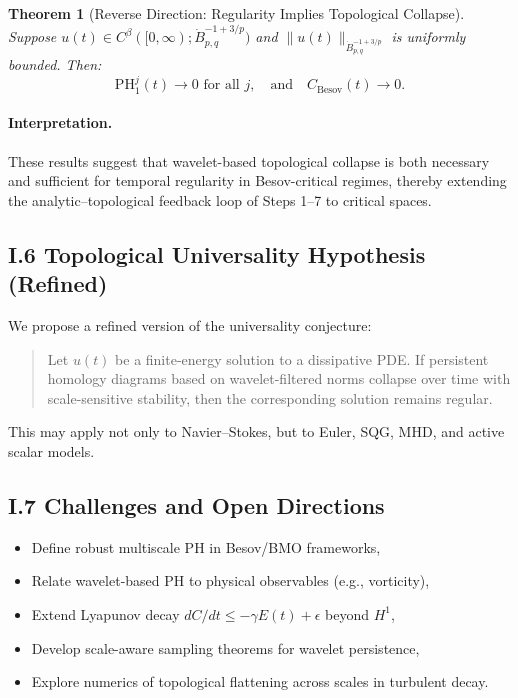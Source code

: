 \documentclass[11pt]{article}
\newtheorem{theorem}{Theorem}[section]
\theoremstyle{definition}
\begin{document}
\begin{theorem}[Reverse Direction: Regularity Implies Topological Collapse]
Suppose $u(t) \in C^\beta([0,\infty); \dot{B}^{-1+3/p}_{p,q})$ and $\|u(t)\|_{\dot{B}^{-1+3/p}_{p,q}}$ is uniformly bounded. Then:
\[ \mathrm{PH}_1^j(t) \to 0 \text{ for all } j, \quad \text{and} \quad C_{\text{Besov}}(t) \to 0. \]
\end{theorem}

\paragraph{Interpretation.} These results suggest that wavelet-based topological collapse is both necessary and sufficient for temporal regularity in Besov-critical regimes, thereby extending the analytic–topological feedback loop of Steps 1–7 to critical spaces.

\subsection*{I.6 Topological Universality Hypothesis (Refined)}

We propose a refined version of the universality conjecture:

\begin{quote}
Let $u(t)$ be a finite-energy solution to a dissipative PDE. If persistent homology diagrams based on wavelet-filtered norms collapse over time with scale-sensitive stability, then the corresponding solution remains regular.
\end{quote}

This may apply not only to Navier--Stokes, but to Euler, SQG, MHD, and active scalar models.

\subsection*{I.7 Challenges and Open Directions}

\begin{itemize}
  \item Define robust multiscale PH in Besov/BMO frameworks,
  \item Relate wavelet-based PH to physical observables (e.g., vorticity),
  \item Extend Lyapunov decay $dC/dt \leq -\gamma E(t) + \epsilon$ beyond $H^1$,
  \item Develop scale-aware sampling theorems for wavelet persistence,
  \item Explore numerics of topological flattening across scales in turbulent decay.
\end{itemize}
\end{document}
